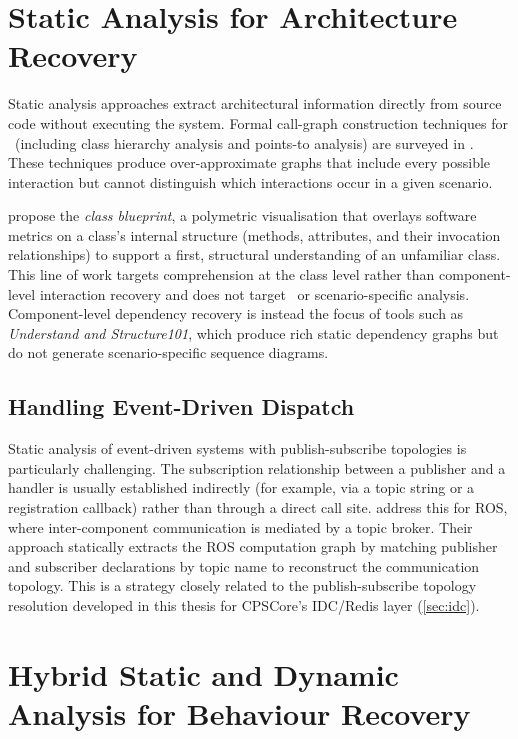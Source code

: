 \section{Static Analysis for Architecture Recovery}

Static analysis approaches extract architectural information directly from source
code without executing the system.
Formal call-graph construction techniques for \Cpp\ (including class hierarchy
analysis and points-to analysis) are surveyed in \textcite{grove:callgraph}.
These techniques produce over-approximate graphs that include every possible
interaction but cannot distinguish which interactions occur in a given scenario.

\textcite{ducasse:softvis} propose the \emph{class blueprint}, a polymetric
visualisation that overlays software metrics on a class's internal structure
(methods, attributes, and their invocation relationships) to support a first,
structural understanding of an unfamiliar class.
This line of work targets comprehension at the class level rather than
component-level interaction recovery and does not target \Cpp\ or
scenario-specific analysis.
Component-level dependency recovery is instead the focus of tools such as
\emph{Understand and Structure101}, which produce rich static dependency graphs but
do not generate scenario-specific sequence diagrams.

\subsection{Handling Event-Driven Dispatch}

Static analysis of event-driven systems with publish-subscribe topologies is
particularly challenging. The subscription relationship between a
publisher and a handler is usually established indirectly (for example, via a
topic string or a registration callback) rather than through a direct call site.
\textcite{santos:roscompgraph} address this for \ac{ROS},
where inter-component communication is mediated by a topic broker.
Their approach statically extracts the ROS computation graph by matching
publisher and subscriber declarations by topic name to reconstruct the
communication topology.
This is a strategy closely related to the publish-subscribe topology
resolution developed in this thesis for CPSCore's IDC/Redis layer
(\cref{sec:idc}).

\section{Hybrid Static and Dynamic Analysis for Behaviour Recovery}

